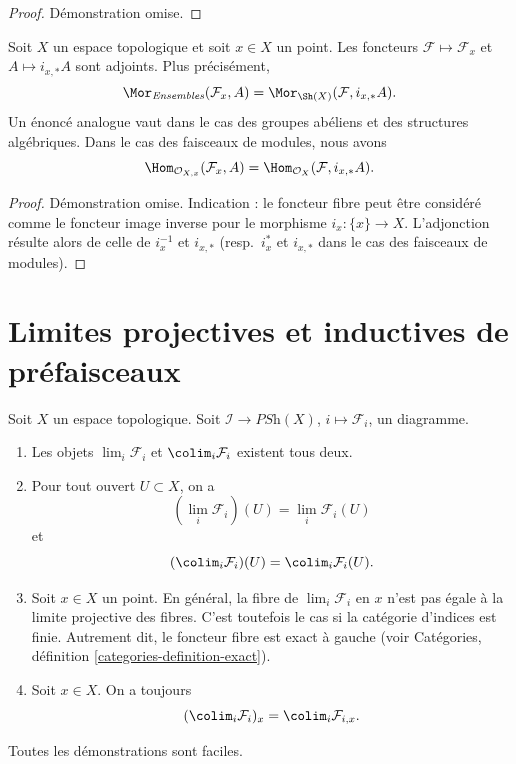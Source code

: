 \begin{proof}
Démonstration omise.
\end{proof}

\begin{lemma}
\label{lemma-stalk-skyscraper-adjoint}
Soit $X$ un espace topologique et soit $x \in X$ un point.
Les foncteurs $\mathcal{F} \mapsto \mathcal{F}_x$ et
$A \mapsto i_{x, *}A$ sont adjoints. Plus précisément,
$$
\Mor_{\textit{Ensembles}}(\mathcal{F}_x, A)
=
\Mor_{\Sh(X)}(\mathcal{F}, i_{x, *}A).
$$
Un énoncé analogue vaut dans le cas des
groupes abéliens et des structures algébriques. Dans le cas des
faisceaux de modules, nous avons
$$
\Hom_{\mathcal{O}_{X, x}}(\mathcal{F}_x, A)
=
\Hom_{\mathcal{O}_X}(\mathcal{F}, i_{x, *}A).
$$
\end{lemma}

\begin{proof}
Démonstration omise. Indication : le foncteur fibre peut être
considéré comme le foncteur image inverse pour le morphisme $i_x : \{x\} \to X$.
L'adjonction résulte alors de celle de
$i_x^{-1}$ et $i_{x, *}$ (resp.\ $i_x^*$ et $i_{x, *}$
dans le cas des faisceaux de modules).
\end{proof}






\section{Limites projectives et inductives de préfaisceaux}
\label{section-limits-presheaves}

\noindent
Soit $X$ un espace topologique.
Soit $\mathcal{I} \to \textit{PSh}(X)$, $i \mapsto \mathcal{F}_i$,
un diagramme.
\begin{enumerate}
\item Les objets $\lim_i \mathcal{F}_i$ et $\colim_i \mathcal{F}_i$
existent tous deux.
\item Pour tout ouvert $U \subset X$, on a
$$
(\lim_i \mathcal{F}_i)(U) =
\lim_i \mathcal{F}_i(U)
$$
et
$$
(\colim_i \mathcal{F}_i)(U) =
\colim_i \mathcal{F}_i(U).
$$
\item Soit $x \in X$ un point. En général, la fibre de
$\lim_i \mathcal{F}_i$ en $x$ n'est pas égale à
la limite projective des fibres. C'est toutefois le cas si la catégorie d'indices est finie.
Autrement dit, le foncteur fibre est
exact à gauche (voir Catégories, définition \ref{categories-definition-exact}).
\item Soit $x \in X$. On a toujours
$$
(\colim_i \mathcal{F}_i)_x =
\colim_i \mathcal{F}_{i, x}.
$$
\end{enumerate}
Toutes les démonstrations sont faciles.

